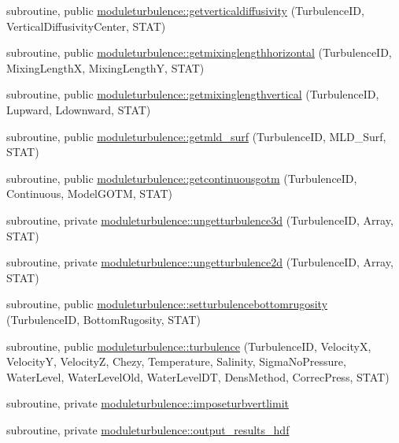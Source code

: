 \begin{DoxyCompactItemize}
\item 
subroutine, public \mbox{\hyperlink{namespacemoduleturbulence_a6067ede135e4137914b0f3958ddc0353}{moduleturbulence\+::getverticaldiffusivity}} (Turbulence\+ID, Vertical\+Diffusivity\+Center, S\+T\+AT)
\item 
subroutine, public \mbox{\hyperlink{namespacemoduleturbulence_ad3675f05df244e553dafe1a09eb8f7e1}{moduleturbulence\+::getmixinglengthhorizontal}} (Turbulence\+ID, Mixing\+LengthX, Mixing\+LengthY, S\+T\+AT)
\item 
subroutine, public \mbox{\hyperlink{namespacemoduleturbulence_a9ca6f654636dff4860b7e20134c59253}{moduleturbulence\+::getmixinglengthvertical}} (Turbulence\+ID, Lupward, Ldownward, S\+T\+AT)
\item 
subroutine, public \mbox{\hyperlink{namespacemoduleturbulence_a8e849950710589a5439a724899ac2b8d}{moduleturbulence\+::getmld\+\_\+surf}} (Turbulence\+ID, M\+L\+D\+\_\+\+Surf, S\+T\+AT)
\item 
subroutine, public \mbox{\hyperlink{namespacemoduleturbulence_a78bc503a0ceb792c161200d1e1e51bf0}{moduleturbulence\+::getcontinuousgotm}} (Turbulence\+ID, Continuous, Model\+G\+O\+TM, S\+T\+AT)
\item 
subroutine, private \mbox{\hyperlink{namespacemoduleturbulence_a3efe4fb95ca7fe2eff42a33023683bd8}{moduleturbulence\+::ungetturbulence3d}} (Turbulence\+ID, Array, S\+T\+AT)
\item 
subroutine, private \mbox{\hyperlink{namespacemoduleturbulence_a036689ae17a2c12c06edbd02b17281c1}{moduleturbulence\+::ungetturbulence2d}} (Turbulence\+ID, Array, S\+T\+AT)
\item 
subroutine, public \mbox{\hyperlink{namespacemoduleturbulence_a9df29956676b28634ce0733aa108c62e}{moduleturbulence\+::setturbulencebottomrugosity}} (Turbulence\+ID, Bottom\+Rugosity, S\+T\+AT)
\item 
subroutine, public \mbox{\hyperlink{namespacemoduleturbulence_aa75d43b0bd3a1b14c9baa4fe1ba2e6f7}{moduleturbulence\+::turbulence}} (Turbulence\+ID, VelocityX, VelocityY, VelocityZ, Chezy, Temperature, Salinity, Sigma\+No\+Pressure, Water\+Level, Water\+Level\+Old, Water\+Level\+DT, Dens\+Method, Correc\+Press, S\+T\+AT)
\item 
subroutine, private \mbox{\hyperlink{namespacemoduleturbulence_a5f1e04626a1dd3845c37639bd960e2e6}{moduleturbulence\+::imposeturbvertlimit}}
\item 
subroutine, private \mbox{\hyperlink{namespacemoduleturbulence_a3366379c368e20e48c460dff1f7585d8}{moduleturbulence\+::output\+\_\+results\+\_\+hdf}}

\end{DoxyCompactItemize}
